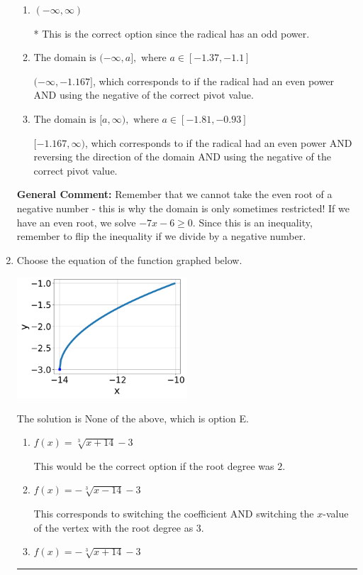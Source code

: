 \documentclass{extbook}[14pt]
\newcommand{\litem}[1]{\item #1

\rule{\textwidth}{0.4pt}}
\begin{document}
\begin{enumerate}
{\begin{enumerate}[label=\Alph*.]
$[-0.857, \infty)$, which corresponds to if the radical had an even power AND reversing the direction of the domain.
\item \( (-\infty, \infty) \)

* This is the correct option since the radical has an odd power.
\item \( \text{The domain is } (-\infty, a], \text{   where } a \in [-1.37, -1.1] \)

$(-\infty, -1.167]$, which corresponds to if the radical had an even power AND using the negative of the correct pivot value.
\item \( \text{The domain is } [a, \infty), \text{   where } a \in [-1.81, -0.93] \)

$[-1.167, \infty)$, which corresponds to if the radical had an even power AND reversing the direction of the domain AND using the negative of the correct pivot value.
\end{enumerate}

\textbf{General Comment:} Remember that we cannot take the even root of a negative number - this is why the domain is only sometimes restricted! If we have an even root, we solve $-7 x - 6 \geq 0$. Since this is an inequality, remember to flip the inequality if we divide by a negative number.
}
\litem{
Choose the equation of the function graphed below.

\begin{center}
    \includegraphics[width=0.5\textwidth]{../Figures/radicalGraphToEquationA.png}
\end{center}


The solution is \( \text{None of the above} \), which is option E.\begin{enumerate}[label=\Alph*.]
\item \( f(x) = \sqrt[3]{x + 14} - 3 \)

This would be the correct option if the root degree was $2$.
\item \( f(x) = - \sqrt[3]{x - 14} - 3 \)

This corresponds to switching the coefficient AND switching the $x$-value of the vertex with the root degree as $3$.
\item \( f(x) = - \sqrt[3]{x + 14} - 3 \)


\end{enumerate}}
\end{enumerate}
\end{document}
